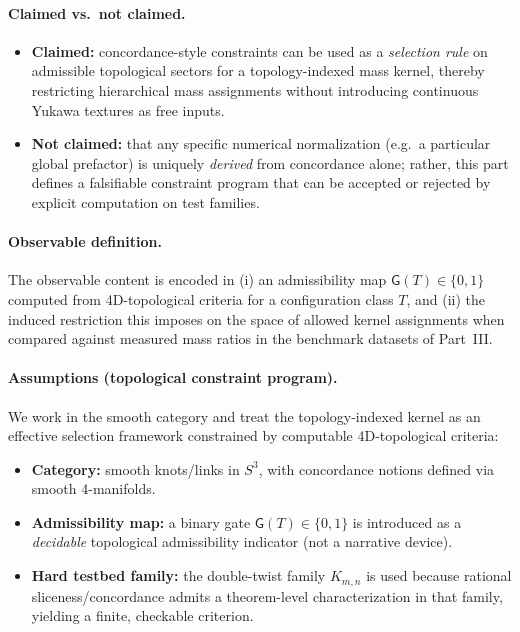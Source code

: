 \documentclass[11pt, a4paper]{article}
\begin{document}
\paragraph{Claimed vs.\ not claimed.}
\begin{itemize}
    \item \textbf{Claimed:} concordance-style constraints can be used as a \emph{selection rule} on admissible topological sectors for a topology-indexed mass kernel, thereby restricting hierarchical mass assignments without introducing continuous Yukawa textures as free inputs.
    \item \textbf{Not claimed:} that any specific numerical normalization (e.g.\ a particular global prefactor) is uniquely \emph{derived} from concordance alone; rather, this part defines a falsifiable constraint program that can be accepted or rejected by explicit computation on test families.
\end{itemize}

\paragraph{Observable definition.}
The observable content is encoded in (i) an admissibility map $\mathsf{G}(T)\in\{0,1\}$ computed from 4D-topological criteria for a configuration class $T$, and (ii) the induced restriction this imposes on the space of allowed kernel assignments when compared against measured mass ratios in the benchmark datasets of Part~III.

\paragraph{Assumptions (topological constraint program).}
We work in the smooth category and treat the topology-indexed kernel as an effective selection framework constrained by computable 4D-topological criteria:
\begin{itemize}
  \item \textbf{Category:} smooth knots/links in $S^3$, with concordance notions defined via smooth 4-manifolds.
  \item \textbf{Admissibility map:} a binary gate $\mathsf{G}(T)\in\{0,1\}$ is introduced as a \emph{decidable} topological admissibility indicator (not a narrative device).
  \item \textbf{Hard testbed family:} the double-twist family $K_{m,n}$ is used because rational sliceness/concordance admits a theorem-level characterization in that family, yielding a finite, checkable criterion.
\end{itemize}
\end{document}
